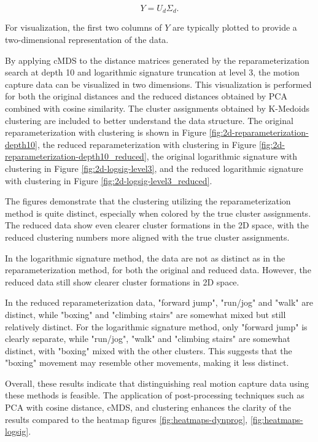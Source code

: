 \begin{equation}
    Y = U_d \Sigma_d.
    \label{eq:cmds-configuration-matrix}
\end{equation}

For visualization, the first two columns of \( Y \) are typically plotted to provide a two-dimensional representation of the data.



By applying cMDS to the distance matrices generated by the reparameterization search at depth 10 and logarithmic signature truncation at level 3, the motion capture data can be visualized in two dimensions. This visualization is performed for both the original distances and the reduced distances obtained by PCA combined with cosine similarity. The cluster assignments obtained by K-Medoids clustering are included to better understand the data structure. The original reparameterization with clustering is shown in Figure \ref{fig:2d-reparameterization-depth10}, the reduced reparameterization with clustering in Figure \ref{fig:2d-reparameterization-depth10_reduced}, the original logarithmic signature with clustering in Figure \ref{fig:2d-logsig-level3}, and the reduced logarithmic signature with clustering in Figure \ref{fig:2d-logsig-level3_reduced}.

The figures demonstrate that the clustering utilizing the reparameterization method is quite distinct, especially when colored by the true cluster assignments. The reduced data show even clearer cluster formations in the 2D space, with the reduced clustering numbers more aligned with the true cluster assignments.

In the logarithmic signature method, the data are not as distinct as in the reparameterization method, for both the original and reduced data. However, the reduced data still show clearer cluster formations in 2D space.

In the reduced reparameterization data, "forward jump", "run/jog" and "walk" are distinct, while "boxing" and "climbing stairs" are somewhat mixed but still relatively distinct. For the logarithmic signature method, only "forward jump" is clearly separate, while "run/jog", "walk" and "climbing stairs" are somewhat distinct, with "boxing" mixed with the other clusters. This suggests that the "boxing" movement may resemble other movements, making it less distinct.

Overall, these results indicate that distinguishing real motion capture data using these methods is feasible. The application of post-processing techniques such as PCA with cosine distance, cMDS, and clustering enhances the clarity of the results compared to the heatmap figures \ref{fig:heatmaps-dynprog}, \ref{fig:heatmaps-logsig}.

